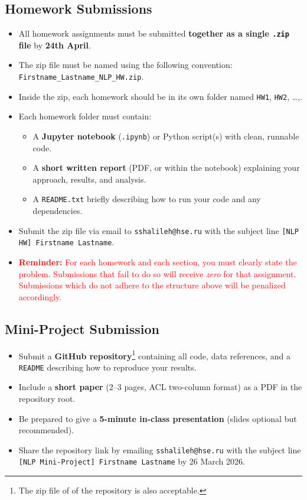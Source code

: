 \documentclass[12pt]{article}
\begin{document}
\subsection*{Homework Submissions}
\begin{itemize}[leftmargin=1.25em]
  \item All homework assignments must be submitted \textbf{together as a single \texttt{.zip} file} by \textbf{24th April}.
  \item The zip file must be named using the following convention: \texttt{Firstname\_Lastname\_NLP\_HW.zip}.
  \item Inside the zip, each homework should be in its own folder named \texttt{HW1}, \texttt{HW2}, \ldots,.
  \item Each homework folder must contain:
  \begin{itemize}
    \item A \textbf{Jupyter notebook} (\texttt{.ipynb}) or Python script(s) with clean, runnable code.
    \item A \textbf{short written report} (PDF, or within the notebook) explaining your approach, results, and analysis.
    \item A \texttt{README.txt} briefly describing how to run your code and any dependencies.
  \end{itemize}
  \item Submit the zip file via email to \texttt{sshalileh@hse.ru} with the subject line \texttt{[NLP HW] Firstname Lastname}.
  \item \textcolor{red}{\textbf{Reminder:} For each homework and each section, you must clearly state the problem. Submissions that fail to do so will receive \emph{zero} for that assignment. Submissions which do not adhere to the structure above will be penalized accordingly.}
\end{itemize}

\subsection*{Mini-Project Submission}
\begin{itemize}[leftmargin=1.25em]
  \item Submit a \textbf{GitHub repository}\footnote{The zip file of of the repository is also acceptable.} containing all code, data references, and a \texttt{README} describing how to reproduce your results.
  \item Include a \textbf{short paper} (2--3 pages, ACL two-column format) as a PDF in the repository root.
  \item Be prepared to give a \textbf{5-minute in-class presentation} (slides optional but recommended).
  \item Share the repository link by emailing \texttt{sshalileh@hse.ru} with the subject line \texttt{[NLP Mini-Project] Firstname Lastname} by 26 March 2026.
\end{itemize}
\end{document}
